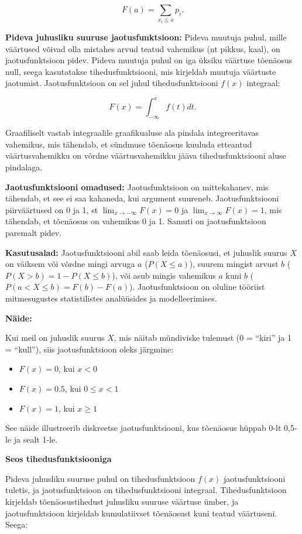 \documentclass[
]{book}
\providecommand{\tightlist}{%
  \setlength{\itemsep}{0pt}\setlength{\parskip}{0pt}}
\theoremstyle{definition}
\theoremstyle{definition}
\theoremstyle{definition}
\theoremstyle{definition}
\theoremstyle{remark}
\begin{document}
\[F(a) = \sum_{x_i \leq a} p_i.\]

\textbf{Pideva juhusliku suuruse jaotusfunktsioon:} Pideva muutuja puhul, mille väärtused võivad olla mistahes arvud teatud vahemikus (nt pikkus, kaal), on jaotusfunktsioon pidev. Pideva muutuja puhul on iga üksiku väärtuse tõenäosus null, seega kasutatakse tihedusfunktsiooni, mis kirjeldab muutuja väärtuste jaotumist. Jaotusfunktsioon on sel juhul tihedusfunktsiooni \(f(x)\) integraal:

\[F(x) = \int_{-\infty}^{x} f(t) dt.\]

Graafiliselt vastab integraalile graafikualuse ala pindala integreeritavas vahemikus, mis tähendab, et sündmuse tõenäosus kuuluda etteantud väärtusvahemikku on võrdne väärtusvahemikku jääva tihedusfunktsiooni aluse pindalaga.

\textbf{Jaotusfunktsiooni omadused:} Jaotusfunktsioon on mittekahanev, mis tähendab, et see ei saa kahaneda, kui argument suureneb. Jaotusfunktsiooni piirväärtused on 0 ja 1, st \(\lim_{x \to -\infty} F(x) = 0\) ja \(\lim_{x \to \infty} F(x) = 1\), mis tähendab, et tõenäosus on vahemikus 0 ja 1. Samuti on jaotusfunktsioon paremalt pidev.

\textbf{Kasutusalad:} Jaotusfunktsiooni abil saab leida tõenäosusi, et juhuslik suurus \(X\) on väiksem või võrdne mingi arvuga \(a\) (\(P(X \leq a)\)), suurem mingist arvust \(b\) (\(P(X > b) = 1 - P(X \leq b)\)), või asub mingis vahemikus \(a\) kuni \(b\) (\(P(a < X \leq b) = F(b) - F(a)\)). Jaotusfunktsioon on oluline tööriist mitmesugustes statistilistes analüüsides ja modelleerimises.

\textbf{Näide:}

Kui meil on juhuslik suurus \(X\), mis näitab mündiviske tulemust (0 = ``kiri'' ja 1 = ``kull''), siis jaotusfunktsioon oleks järgmine:

\begin{itemize}
\tightlist
\item
  \(F(x) = 0\), kui \(x < 0\)
\item
  \(F(x) = 0.5\), kui \(0 \leq x < 1\)
\item
  \(F(x) = 1\), kui \(x \geq 1\)
\end{itemize}

See näide illustreerib diskreetse jaotusfunktsiooni, kus tõenäosus hüppab 0-lt 0,5-le ja sealt 1-le.

\textbf{Seos tihedusfunktsiooniga}

Pideva juhusliku suuruse puhul on tihedusfunktsioon \(f(x)\) jaotusfunktsiooni tuletis, ja jaotusfunktsioon on tihedusfunktsiooni integraal. Tihedusfunktsioon kirjeldab tõenäosustihedust juhusliku suuruse väärtuse ümber, ja jaotusfunktsioon kirjeldab kumulatiivset tõenäosust kuni teatud väärtuseni. Seega:
\end{document}
